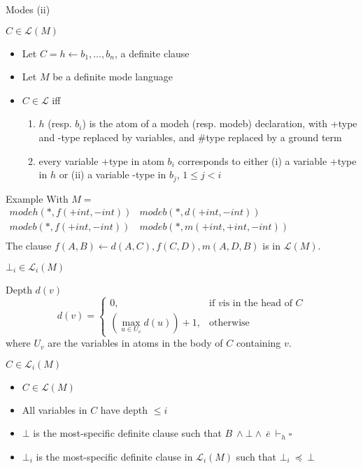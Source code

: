 \begin{frame}{Modes (ii)}
\begin{block}{$C \in \mathcal{L}(M)$}
\begin{itemize}
    \item Let $C = h \leftarrow b_1, \dots, b_n$, a definite clause
    \item Let $M$ be a definite mode language
    \item $C \in \mathcal{L}$ iff
    \begin{enumerate}
        \item $h$ (resp. $b_i$) is the atom of a modeh (resp. modeb) declaration, with +type and -type replaced by variables, and \#type replaced by a ground term
        \item every variable +type in atom $b_i$ corresponds to either (i) a variable +type in $h$ or (ii) a variable -type in $b_j$, $1 \leq j < i$ 
    \end{enumerate}
\end{itemize}
\end{block}

\begin{block}{Example}
With $M=$
$\begin{array}{ll}
modeh(*,f(+int,-int)) & modeb(*,d(+int,-int))  \\
modeb(*,f(+int,-int)) & modeb(*,m(+int,+int,-int)) \\
\end{array}$\\
\vspace{5pt}
The clause $ f(A,B) \leftarrow d(A,C), f(C,D), m(A,D,B) $ is in $\mathcal{L}(M)$.
\end{block}

\end{frame}

\begin{frame}{$\bot_i \in \mathcal{L}_i(M)$}
\begin{block}{Depth $d(v)$}
\[
    d(v) = 
\begin{cases}
    0, & \text{if } v \text{is in the head of }C\\
    (\max_{u\in U_v} d(u)) +1,              & \text{otherwise}
\end{cases}
\] where $U_v$ are the variables in atoms in the body of $C$ containing $v$.
\end{block}
\begin{block}{$C \in \mathcal{L}_i(M)$}
\begin{itemize}
    \item $C \in \mathcal{L}(M)$
    \item All variables in $C$ have depth $\leq i$
\end{itemize}
\end{block}    
\begin{itemize}
    \item $\bot$ is the most-specific definite clause such that 
    $ B \ \land \bot \land \ \overline{e} \ \vdash_h \square$
    \item $\bot_i$ is the most-specific definite clause in $\mathcal{L}_i(M)$ such that $\bot_i \ \preceq \ \bot$
\end{itemize}
\end{frame}

